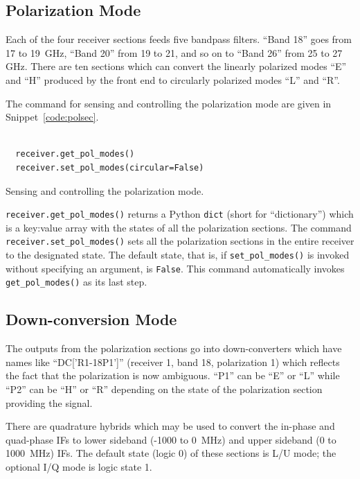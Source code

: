 \documentclass[letterpaper,11pt]{book}
\begin{document}
\subsection{Polarization Mode}

Each of the four receiver sections feeds five bandpass filters.
``Band 18'' goes from 17 to 19~GHz, ``Band 20'' from 19 to 21, and so on to
``Band 26'' from 25 to 27 GHz.  There are ten sections which can convert the
linearly polarized modes ``E'' and ``H'' produced by the front end to 
circularly polarized modes ``L'' and ``R''.  

The command for sensing and controlling the polarization mode are given in
Snippet~\ref{code:polsec}.
\begin{code}[h!tb]
\begin{center}
  \begin{verbatim}
  
  receiver.get_pol_modes()
  receiver.set_pol_modes(circular=False)\end{verbatim}
\caption{\label{code:polsec}Sensing and controlling the polarization mode.}
\end{center}
\end{code}
{\tt receiver.get\_pol\_modes()} returns a Python {\tt dict} (short for 
``dictionary'') which is a key:value  array with the states of all the 
polarization sections.  The command {\tt receiver.set\_pol\_modes()}
sets all the polarization sections in the entire receiver to the designated
state. The default state, that is, if {\tt set\_pol\_modes()} is invoked
without specifying an argument, is {\tt False}.  This command automatically 
invokes {\tt get\_pol\_modes()} as its last step.

\subsection{Down-conversion Mode}

The outputs from the polarization sections go into down-converters which have
names like ``DC['R1-18P1']'' (receiver 1, band 18, polarization 1) which 
reflects the fact that the polarization is
now ambiguous. ``P1'' can be ``E'' or ``L'' while ``P2'' can be ``H'' or ``R''
depending on the state of the polarization section providing the signal.

There are quadrature hybrids which may be used to convert the
in-phase and quad-phase IFs to lower sideband (-1000 to 0~MHz) and upper 
sideband (0 to 1000~MHz) IFs.  The default state (logic 0) of these sections is
L/U mode; the optional I/Q mode is logic state 1.  
\end{document}
